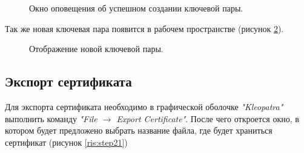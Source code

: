 \documentclass[10pt,a4paper]{report}
\begin{document}
\begin{figure}[h]
	\caption{Окно оповещения об успешном создании ключевой пары.}
	\label{ris:step14}
\end{figure}

Так же новая ключевая пара появится в рабочем пространстве (рисунок \ref{ris:step15}).

\begin{figure}[h]
	\caption{Отображение новой ключевой пары.}
	\label{ris:step15}
\end{figure}

\subsection{Экспорт сертификата}
Для экспорта сертификата необходимо в графической оболочке \textit{"Kleopatra"} выполнить команду \textit{"File \begin{math}\to\end{math} Export Certificate"}. После чего откроется окно, в котором будет предложено выбрать название файла, где будет храниться сертификат (рисунок \ref{ris:step21})
\end{document}
